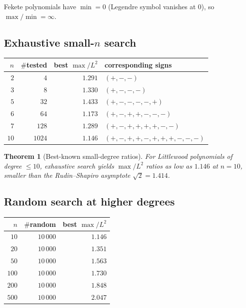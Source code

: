 \documentclass[11pt,a4paper]{article}
\newtheorem{theorem}{Theorem}[section]
\begin{document}
Fekete polynomials have $\min = 0$ (Legendre symbol vanishes at $0$), so $\max/\min = \infty$.

\subsection{Exhaustive small-$n$ search}

\begin{center}
\begin{tabular}{rrrl}
\toprule
$n$ & $\#$tested & best $\max/L^2$ & corresponding signs \\
\midrule
$2$  & $4$    & $1.291$ & $(+, -, -)$ \\
$3$  & $8$    & $1.330$ & $(+, -, -, -)$ \\
$5$  & $32$   & $1.433$ & $(+, -, -, -, -, +)$ \\
$6$  & $64$   & $\mathbf{1.173}$ & $(+, -, +, +, -, -, -)$ \\
$7$  & $128$  & $1.289$ & $(+, -, +, +, +, +, -, -)$ \\
$10$ & $1024$ & $\mathbf{1.146}$ & $(+, -, +, +, -, +, +, +, -, -, -)$ \\
\bottomrule
\end{tabular}
\end{center}

\begin{theorem}[Best-known small-degree ratios]\label{thm:best-small}
For Littlewood polynomials of degree $\le 10$, exhaustive search yields
$\max/L^2$ ratios as low as $1.146$ at $n = 10$, smaller than the
Rudin--Shapiro asymptote $\sqrt{2} = 1.414$.
\end{theorem}

\subsection{Random search at higher degrees}

\begin{center}
\begin{tabular}{rrr}
\toprule
$n$ & $\#$random & best $\max/L^2$ \\
\midrule
$10$  & $10\,000$ & $1.146$ \\
$20$  & $10\,000$ & $1.351$ \\
$50$  & $10\,000$ & $1.563$ \\
$100$ & $10\,000$ & $1.730$ \\
$200$ & $10\,000$ & $1.848$ \\
$500$ & $10\,000$ & $2.047$ \\
\bottomrule
\end{tabular}
\end{center}
\end{document}
